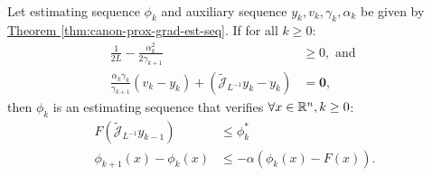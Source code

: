 \documentclass[12pt]{article}
\begin{document}
    \begin{theorem}\;\\
        Let estimating sequence $\phi_k$ and auxiliary sequence $y_k, v_k,\gamma_k, \alpha_k$  be given by 
        \hyperref[thm:canon-prox-grad-est-seq]{Theorem \ref*{thm:canon-prox-grad-est-seq}}. 
        If for all $k\ge 0$: 
        \begin{align*}
            \frac{1}{2L} - \frac{\alpha_k^2}{2 \gamma_{k + 1}} &\ge 0, \text{ and }
            \\
            \frac{\alpha_k \gamma_k }{\gamma_{k + 1}} 
            (v_k - y_k) + (\widetilde {\mathcal J}_{L^{-1}} y_k - y_k) &= \mathbf 0, 
        \end{align*}
        then $\phi_{k}$ is an estimating sequence that verifies $\forall x \in \mathbb R^n, k \ge 0$: 
        \begin{align*}
            F\left(
                \widetilde{\mathcal J}_{L^{-1}} y_{k - 1}
            \right) 
            &\le \phi_k^*
            \\
            \phi_{k + 1}(x) - \phi_k(x) &\le -\alpha(\phi_k(x) - F(x)). 
        \end{align*}
    \end{theorem}
\end{document}
